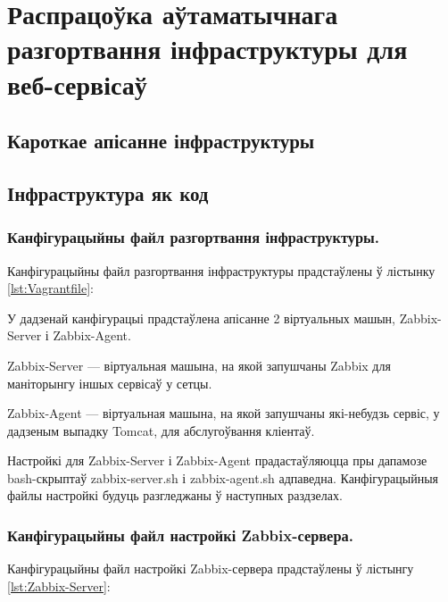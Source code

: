 \section{Распрацоўка аўтаматычнага разгортвання інфраструктуры для веб-сервісаў}

\subsection{Кароткае апісанне інфраструктуры}

\subsection{Інфраструктура як код}

\subsubsection{Канфігурацыйны файл разгортвання інфраструктуры.}
Канфігурацыйны файл разгортвання інфраструктуры прадстаўлены ў лістынку
\ref{lst:Vagrantfile}:



У дадзенай канфігурацыі прадстаўлена апісанне 2 віртуальных машын,
Zabbix-Server і Zabbix-Agent.

Zabbix-Server --- віртуальная машына, на якой запушчаны Zabbix для
маніторынгу іншых сервісаў у сетцы.

Zabbix-Agent --- віртуальная машына, на якой запушчаны які-небудзь сервіс,
у дадзеным выпадку Tomcat, для абслугоўвання кліентаў.

Настройкі для Zabbix-Server і Zabbix-Agent прадастаўляюцца пры дапамозе
bash-скрыптаў zabbix-server.sh і zabbix-agent.sh адпаведна.
Канфігурацыйныя файлы настройкі будуць разгледжаны ў наступных раздзелах.

\subsubsection{Канфігурацыйны файл настройкі Zabbix-сервера.}
Канфігурацыйны файл настройкі Zabbix-сервера прадстаўлены ў лістынгу
\ref{lst:Zabbix-Server}:



